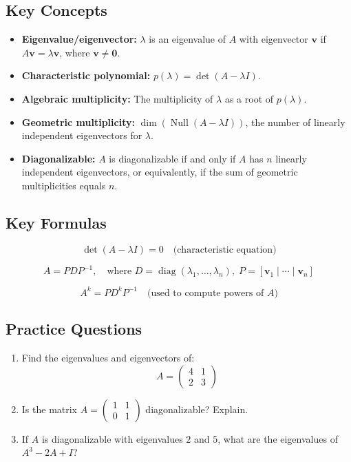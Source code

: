 \documentclass[
    language=english,
    doctype=study-guide,
    institution=none,
]{../../omnilatex}
\begin{document}
\subsection{Key Concepts}

\begin{itemize}
    \item \textbf{Eigenvalue/eigenvector:} $\lambda$ is an eigenvalue of $A$ with eigenvector $\mathbf{v}$ if $A\mathbf{v} = \lambda\mathbf{v}$, where $\mathbf{v} \neq \mathbf{0}$.
    \item \textbf{Characteristic polynomial:} $p(\lambda) = \det(A - \lambda I)$.
    \item \textbf{Algebraic multiplicity:} The multiplicity of $\lambda$ as a root of $p(\lambda)$.
    \item \textbf{Geometric multiplicity:} $\dim(\operatorname{Null}(A - \lambda I))$, the number of linearly independent eigenvectors for $\lambda$.
    \item \textbf{Diagonalizable:} $A$ is diagonalizable if and only if $A$ has $n$ linearly independent eigenvectors, or equivalently, if the sum of geometric multiplicities equals $n$.
\end{itemize}

\subsection{Key Formulas}

\[
\det(A - \lambda I) = 0 \quad \text{(characteristic equation)}
\]

\[
A = PDP^{-1}, \quad \text{where } D = \operatorname{diag}(\lambda_1, \ldots, \lambda_n), \; P = [\mathbf{v}_1 \mid \cdots \mid \mathbf{v}_n]
\]

\[
A^k = PD^kP^{-1} \quad \text{(used to compute powers of } A\text{)}
\]

\subsection{Practice Questions}

\begin{enumerate}
    \item Find the eigenvalues and eigenvectors of:
    \[
        A = \begin{pmatrix} 4 & 1 \\ 2 & 3 \end{pmatrix}
    \]
    \item Is the matrix $A = \begin{pmatrix} 1 & 1 \\ 0 & 1 \end{pmatrix}$ diagonalizable? Explain.
    \item If $A$ is diagonalizable with eigenvalues $2$ and $5$, what are the eigenvalues of $A^3 - 2A + I$?
\end{enumerate}
\end{document}

